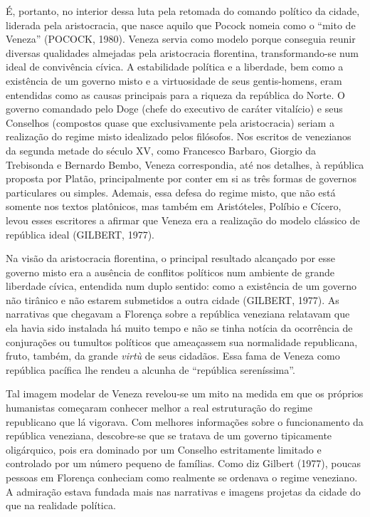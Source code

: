 É, portanto, no interior dessa luta pela retomada do comando político da
cidade, liderada pela aristocracia, que nasce aquilo que Pocock nomeia
como o ``mito de Veneza'' (POCOCK, 1980). Veneza servia como modelo
porque conseguia reunir diversas qualidades almejadas pela aristocracia
florentina, transformando-se num ideal de convivência cívica. A
estabilidade política e a liberdade, bem como a existência de um governo
misto e a virtuosidade de seus gentis-homens, eram entendidas como as
causas principais para a riqueza da república do Norte. O governo
comandado pelo Doge (chefe do executivo de caráter vitalício) e seus
Conselhos (compostos quase que exclusivamente pela aristocracia) seriam
a realização do regime misto idealizado pelos filósofos. Nos escritos de
venezianos da segunda metade do século XV, como Francesco Barbaro,
Giorgio da Trebisonda e Bernardo Bembo, Veneza correspondia, até nos
detalhes, à república proposta por Platão, principalmente por conter em
si as três formas de governos particulares ou simples. Ademais, essa
defesa do regime misto, que não está somente nos textos platônicos, mas
também em Aristóteles, Políbio e Cícero, levou esses escritores a
afirmar que Veneza era a realização do modelo clássico de república
ideal (GILBERT, 1977).

Na visão da aristocracia florentina, o principal resultado alcançado por
esse governo misto era a ausência de conflitos políticos num ambiente de
grande liberdade cívica, entendida num duplo sentido: como a existência
de um governo não tirânico e não estarem submetidos a outra cidade
(GILBERT, 1977). As narrativas que chegavam a Florença sobre a república
veneziana relatavam que ela havia sido instalada há muito tempo e não se
tinha notícia da ocorrência de conjurações ou tumultos políticos que
ameaçassem sua normalidade republicana, fruto, também, da grande
\emph{virtù} de seus cidadãos. Essa fama de Veneza como república
pacífica lhe rendeu a alcunha de ``república sereníssima''.

Tal imagem modelar de Veneza revelou-se um mito na medida em que os
próprios humanistas começaram conhecer melhor a real estruturação do
regime republicano que lá vigorava. Com melhores informações sobre o
funcionamento da república veneziana, descobre-se que se tratava de um
governo tipicamente oligárquico, pois era dominado por um Conselho
estritamente limitado e controlado por um número pequeno de famílias.
Como diz Gilbert (1977), poucas pessoas em Florença conheciam como
realmente se ordenava o regime veneziano. A admiração estava fundada
mais nas narrativas e imagens projetas da cidade do que na realidade
política.

